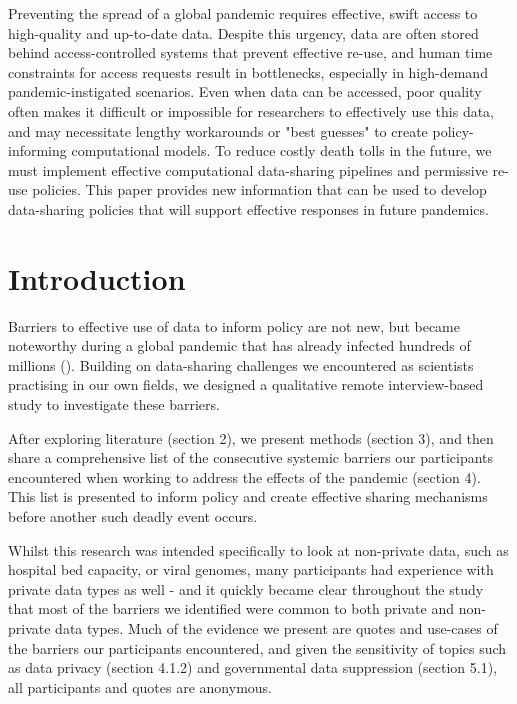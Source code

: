 \documentclass{CUP-JNL-DAP}%
\begin{document}
\begin{Frontmatter}
\begin{policy}
Preventing the spread of a global pandemic requires effective, swift access to high-quality and up-to-date data. Despite this urgency, data are often stored behind access-controlled systems that prevent effective re-use, and human time constraints for access requests result in bottlenecks, especially in high-demand pandemic-instigated scenarios. Even when data can be accessed, poor quality often makes it difficult or impossible for researchers to effectively use this data, and may necessitate lengthy workarounds or "best guesses" to create policy-informing computational models. To reduce costly death tolls in the future, we must implement effective computational data-sharing pipelines and permissive re-use policies. This paper provides new information that can be used to develop data-sharing policies that will support effective responses in future pandemics.
\end{policy}
\end{Frontmatter}


\section{Introduction}
Barriers to effective use of data to inform policy are not new, but became noteworthy during a global pandemic that has already infected hundreds of millions (\cite{owidcoronavirus}). Building on data-sharing challenges we encountered as scientists practising in our own fields, we designed a qualitative remote interview-based study to investigate these barriers. 

After exploring literature (section 2), we present methods (section 3), and then share a comprehensive list of the consecutive systemic barriers our participants encountered when working to address the effects of the pandemic (section 4). This list is presented to inform policy and create effective sharing mechanisms before another such deadly event occurs. 

Whilst this research was intended specifically to look at non-private data, such as hospital bed capacity, or viral genomes, many participants had experience with private data types as well - and it quickly became clear throughout the study that most of the barriers we identified were common to both private and non-private data types. Much of the evidence we present are quotes and use-cases of the barriers our participants encountered, and given the sensitivity of topics such as data privacy (section 4.1.2) and governmental data suppression (section 5.1), all participants and quotes are anonymous. 
\end{document}
